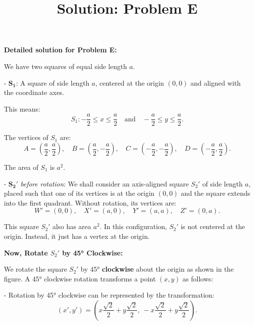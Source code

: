 \documentclass[12pt,a4paper]{article}
\begin{document}
\title{\textbf{Solution: Problem E}}
\author{}
\date{}
\maketitle
\thispagestyle{fancy}

\noindent\textbf{Detailed solution for Problem E:}

We have two squares of equal side length \( a \).

- \(\mathbf{S_1}\): A square of side length \( a \), centered at the origin \((0,0)\) and aligned with the coordinate axes.

  This means:
  \[
  S_1: -\frac{a}{2} \le x \le \frac{a}{2} \quad\text{and}\quad -\frac{a}{2} \le y \le \frac{a}{2}.
  \]
  
  The vertices of \( S_1 \) are:
  \[
  A = \left(\frac{a}{2}, \frac{a}{2}\right), \quad B = \left(\frac{a}{2}, -\frac{a}{2}\right), \quad C = \left(-\frac{a}{2}, -\frac{a}{2}\right), \quad D = \left(-\frac{a}{2}, \frac{a}{2}\right).
  \]

  The area of \( S_1 \) is \( a^2 \).

\medskip

- \(\mathbf{S_2'}\) \textit{before rotation}:  
  We shall consider an axis-aligned square \( S_2' \) of side length \( a \), placed such that one of its vertices is at the origin \((0,0)\) and the square extends into the first quadrant. Without rotation, its vertices are:
  \[
  W'=(0,0), \quad X'=(a,0), \quad Y'=(a,a), \quad Z'=(0,a).
  \]

  This square \( S_2' \) also has area \( a^2 \). In this configuration, \( S_2' \) is not centered at the origin. Instead, it just has a vertex at the origin.

\medskip

\noindent\textbf{Now, Rotate \( S_2' \) by 45° Clockwise:}

We rotate the square \( S_2' \) by 45° \textbf{clockwise} about the origin as shown in the figure. A 45° clockwise rotation transforms a point \((x,y)\) as follows:

- Rotation by 45° clockwise can be represented by the transformation:
  \[
  (x',y') = \left(x\frac{\sqrt{2}}{2} + y\frac{\sqrt{2}}{2},\ -x\frac{\sqrt{2}}{2} + y\frac{\sqrt{2}}{2}\right).
  \]

\medskip
\end{document}
